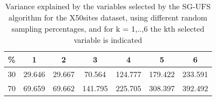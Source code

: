 \begin{table}
	\begin{center}
		\begin{tabular}{c c c c c c c}
			\% & 1 & 2 & 3 & 4 & 5 & 6 \\
			\hline
			30 & 29.646 & 29.667 & 70.564 & 124.777 & 179.422 & 233.591 \\
			70 & 69.659 & 69.662 & 141.795 & 225.705 & 308.397 & 392.492 \\
		\end{tabular}
	\end{center}
	\caption{Variance explained by the variables selected by the SG-UFS algorithm for the X50sites dataset, using different random sampling percentages, and for k = 1,..,6 the kth selected variable is indicated}
\end{table}